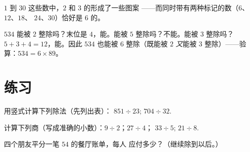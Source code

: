 \begin{omfigure}

{\small $1$ 到 $30$ 这些数中，$2$ 和 $3$ 的形成了一些图案
——而同时带有两种标记的数（$6$、$12$、$18$、
$24$、$30$）恰好是 $6$ 的。}
\end{omfigure}

\begin{example}\label{ex:g5:division:criteria}
$534$ 能被 $2$ 整除吗？末位是 $4$，能。能被 $5$ 整除吗？不能。能被 $3$ 整除吗？
$5 + 3 + 4 = 12$，能。因此 $534$ 也能被 $6$ 整除（既能被 $2$
\emph{又}能被 $3$ 整除）——验算：$534 = 6 \times 89$。
\end{example}

\section{练习}

\begin{exercise}[$\star$]\label{exo:g5:division:1}
用竖式计算下列除法（先列出表）：
$851 \div 23$; \quad $704 \div 32$.
\end{exercise}

\begin{exercise}[$\star$]\label{exo:g5:division:2}
计算下列商（写成准确的小数）：$9 \div 2$；\quad $27 \div 4$；
\quad $33 \div 5$; \quad $21 \div 8$.
\end{exercise}

\begin{exercise}[$\star$]\label{exo:g5:division:3}
四个朋友平分一笔 $54$ 的餐厅账单，每人
应付多少？（继续除到以后。）
\end{exercise}

